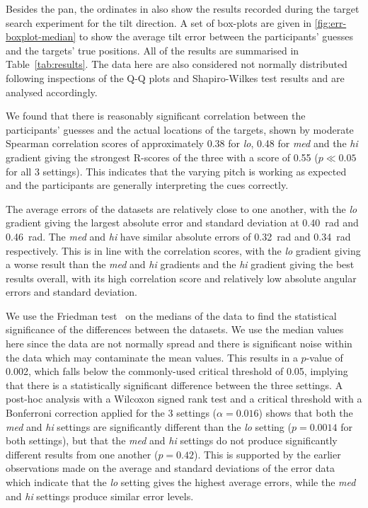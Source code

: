 \documentclass[sigconf, review=true, screen=true, anonymous=true]{acmart}
\begin{document}
Besides the pan, the ordinates in  also show the results recorded during the target search experiment for the tilt direction.
A set of box-plots are given in \cref{fig:err-boxplot-median} to show the average tilt error between the participants' guesses and the targets' true positions.
All of the results are summarised in Table~\ref{tab:results}. 
The data here are also considered not normally distributed following inspections of the Q-Q plots and Shapiro-Wilkes test results and are analysed accordingly.

We found that there is reasonably significant correlation between the participants' guesses and the actual locations of the targets, shown by moderate Spearman correlation scores of approximately 0.38 for \emph{lo}, 0.48 for \emph{med} and the \emph{hi} gradient giving the strongest R-scores of the three with a score of 0.55 ($p \ll 0.05$ for all 3 settings).
This indicates that the varying pitch is working as expected and the participants are generally interpreting the cues correctly. 

The average errors of the datasets are relatively close to one another, with the \emph{lo} gradient giving the largest absolute error and standard deviation at \SI{0.40}{\radian} and \SI{0.46}{\radian}.
The \emph{med} and \emph{hi} have similar absolute errors of \SI{0.32}{\radian} and \SI{0.34}{\radian} respectively.
This is in line with the correlation scores, with the \emph{lo} gradient giving a worse result than the \emph{med} and \emph{hi} gradients and the \emph{hi} gradient giving the best results overall, with its high correlation score and relatively low absolute angular errors and standard deviation. 

We use the Friedman test~\cite{friedman1937use} on the medians of the data to find the statistical significance of the differences between the datasets.
We use the median values here since the data are not normally spread and there is significant noise within the data which may contaminate the mean values.
This results in a $p$-value of 0.002, which falls below the commonly-used critical threshold of 0.05, implying that there is a statistically significant difference between the three settings.
A post-hoc analysis with a Wilcoxon signed rank test and a critical threshold with a Bonferroni correction applied for the 3 settings ($\alpha=0.016$) shows that both the \emph{med} and \emph{hi} settings are significantly different than the \emph{lo} setting ($p=0.0014$ for both settings), but that the \emph{med} and \emph{hi} settings do not produce significantly different results from one another ($p=0.42$).
This is supported by the earlier observations made on the average and standard deviations of the error data which indicate that the \emph{lo} setting gives the highest average errors, while the \emph{med} and \emph{hi} settings produce similar error levels. 
\end{document}
